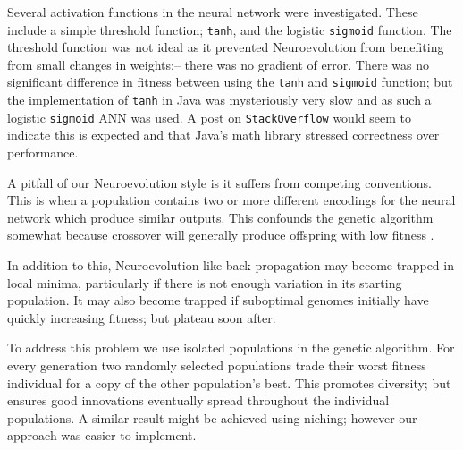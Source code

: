 Several activation functions in the neural network were investigated. These include a simple threshold function; \texttt{tanh}, and the logistic \texttt{sigmoid} function. The threshold function was not ideal as it prevented Neuroevolution from benefiting from small changes in weights;-- there was no gradient of error. There was no significant difference in fitness between using the \texttt{tanh} and \texttt{sigmoid} function; but the implementation of \texttt{tanh} in Java was mysteriously very slow and as such a logistic \texttt{sigmoid} ANN was used. A post on \texttt{StackOverflow} \cite{slowtanh} would seem to indicate this is expected and that Java's math library stressed correctness over performance.

A pitfall of our Neuroevolution style is it suffers from competing conventions. This is when a population contains two or more different encodings for the neural network which produce similar outputs. This confounds the genetic algorithm somewhat because crossover will generally produce offspring with low fitness \cite{mattiussi2011beyond}.

In addition to this, Neuroevolution like back-propagation may become trapped in local minima, particularly if there is not enough variation in its starting population. It may also become trapped if suboptimal genomes initially have quickly increasing fitness; but plateau soon after.

To address this problem we use isolated populations in the genetic algorithm. For every generation two randomly selected populations trade their worst fitness individual for a copy of the other population's best. This promotes diversity; but ensures good innovations eventually spread throughout the individual populations. A similar result might be achieved using niching; however our approach was easier to implement.


